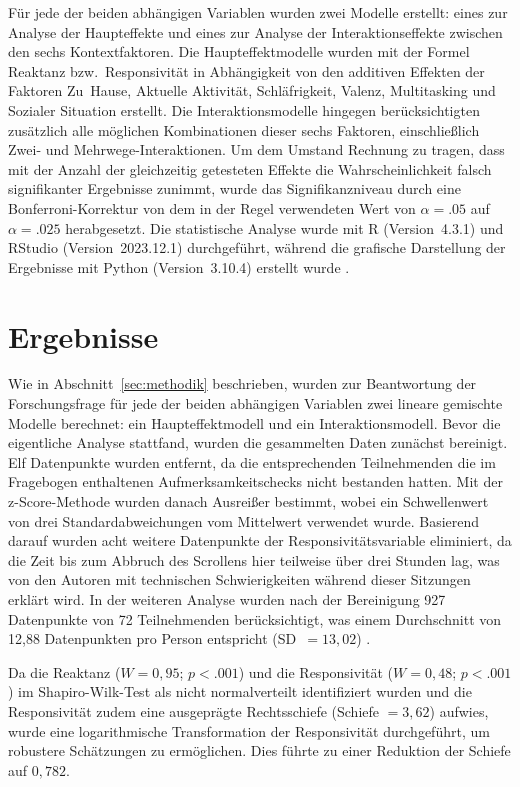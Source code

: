 \documentclass[11pt,a4paper]{article}
\begin{document}
Für jede der beiden abhängigen Variablen wurden zwei Modelle erstellt: eines zur Analyse der
Haupteffekte und eines zur Analyse der Interaktionseffekte zwischen den sechs Kontextfaktoren.
Die Haupteffektmodelle wurden mit der Formel Reaktanz bzw.\ Responsivität in Abhängigkeit von
den additiven Effekten der Faktoren Zu~Hause, Aktuelle Aktivität, Schläfrigkeit, Valenz,
Multitasking und Sozialer Situation erstellt. Die Interaktionsmodelle hingegen
berücksichtigten zusätzlich alle möglichen Kombinationen dieser sechs Faktoren, einschließlich
Zwei- und Mehrwege-Interaktionen. Um dem Umstand Rechnung zu tragen, dass mit der Anzahl der
gleichzeitig getesteten Effekte die Wahrscheinlichkeit falsch signifikanter Ergebnisse
zunimmt, wurde das Signifikanzniveau durch eine Bonferroni-Korrektur von dem in der Regel
verwendeten Wert von $\alpha=.05$ auf $\alpha=.025$ herabgesetzt. Die statistische Analyse
wurde mit R (Version~4.3.1) und RStudio (Version~2023.12.1) durchgeführt, während die
grafische Darstellung der Ergebnisse mit Python (Version~3.10.4) erstellt wurde
\citep{meinhardt2025scrolling}.

\section{Ergebnisse}
\label{sec:ergebnisse}

Wie in Abschnitt~\ref{sec:methodik} beschrieben, wurden zur Beantwortung der Forschungsfrage
für jede der beiden abhängigen Variablen zwei lineare gemischte Modelle berechnet: ein
Haupteffektmodell und ein Interaktionsmodell. Bevor die eigentliche Analyse stattfand, wurden
die gesammelten Daten zunächst bereinigt. Elf Datenpunkte wurden entfernt, da die
entsprechenden Teilnehmenden die im Fragebogen enthaltenen Aufmerksamkeitschecks nicht
bestanden hatten. Mit der z-Score-Methode wurden danach Ausreißer bestimmt, wobei ein
Schwellenwert von drei Standardabweichungen vom Mittelwert verwendet wurde. Basierend darauf
wurden acht weitere Datenpunkte der Responsivitätsvariable eliminiert, da die Zeit bis zum
Abbruch des Scrollens hier teilweise über drei Stunden lag, was von den Autoren mit
technischen Schwierigkeiten während dieser Sitzungen erklärt wird. In der weiteren Analyse
wurden nach der Bereinigung 927 Datenpunkte von 72 Teilnehmenden berücksichtigt, was einem
Durchschnitt von 12,88 Datenpunkten pro Person entspricht (SD~$=13{,}02$)
\citep{meinhardt2025scrolling}.

Da die Reaktanz ($W=0{,}95$; $p<.001$) und die Responsivität ($W=0{,}48$; $p<.001$) im
Shapiro-Wilk-Test als nicht normalverteilt identifiziert wurden und die Responsivität zudem
eine ausgeprägte Rechtsschiefe (Schiefe $=3{,}62$) aufwies, wurde eine logarithmische
Transformation der Responsivität durchgeführt, um robustere Schätzungen zu ermöglichen. Dies
führte zu einer Reduktion der Schiefe auf $0{,}782$.
\end{document}
